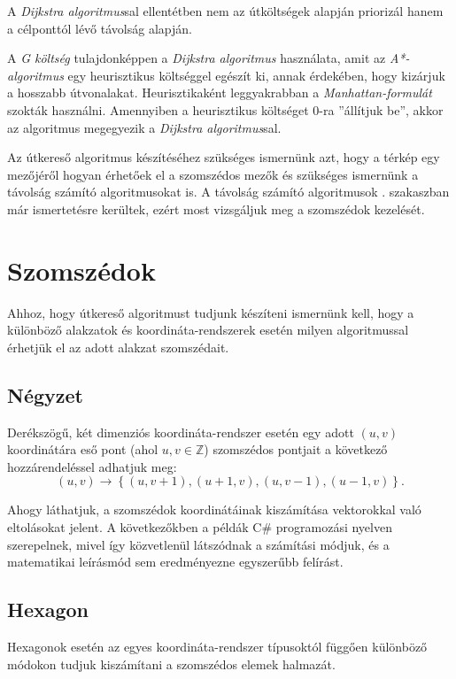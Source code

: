 A \textit{Dijkstra algoritmus}sal ellentétben nem az útköltségek alapján priorizál hanem a célponttól lévő távolság alapján.

A \textit{G költség} tulajdonképpen a \textit{Dijkstra algoritmus} használata, amit az \textit{A*-algo\-rit\-mus} egy heurisztikus költséggel egészít ki, annak érdekében, hogy kizárjuk a hosszabb útvonalakat. Heurisztikaként leggyakrabban a \textit{Manhattan-formulát} szokták használni. Amennyiben a heurisztikus költséget 0-ra ''állítjuk be'', akkor az algoritmus megegyezik a \textit{Dijkstra algoritmus}sal.

Az útkereső algoritmus készítéséhez szükséges ismernünk azt, hogy a térkép egy mezőjéről hogyan érhetőek el a szomszédos mezők és szükséges ismernünk a távolság számító algoritmusokat is. A távolság számító algoritmusok . szakaszban már ismertetésre kerültek, ezért most vizsgáljuk meg a szomszédok kezelését.

\section{Szomszédok}
\cite{redblobgamesHexagonalGrids}

Ahhoz, hogy útkereső algoritmust tudjunk készíteni ismernünk kell, hogy a különböző alakzatok és koordináta-rendszerek esetén milyen algoritmussal érhetjük el az adott alakzat szomszédait. 

\subsection{Négyzet}
\cite{redblobA*}

Derékszögű, két dimenziós koordináta-rendszer esetén egy adott $(u, v)$ koordinátára eső pont (ahol $u, v \in \mathbb{Z}$) szomszédos pontjait a következő hozzárendeléssel adhatjuk meg:
$$
(u, v) \rightarrow
\left\{
(u, v+1), (u+1, v), (u, v-1), (u-1, v)
\right\}.
$$

Ahogy láthatjuk, a szomszédok koordinátáinak kiszámítása vektorokkal való eltolásokat jelent. A következőkben a példák C\# programozási nyelven szerepelnek, mivel így közvetlenül látszódnak a számítási módjuk, és a matematikai leírásmód sem eredményezne egyszerűbb felírást.

\subsection{Hexagon}

Hexagonok esetén az egyes koordináta-rendszer típusoktól függően különböző módokon tudjuk kiszámítani a szomszédos elemek halmazát.

